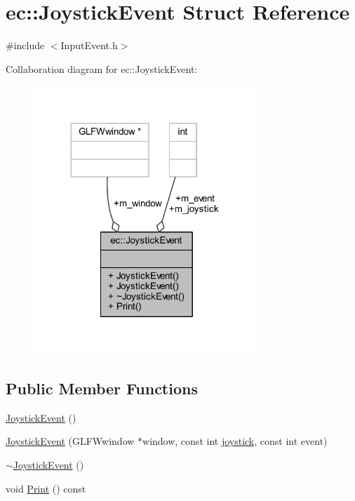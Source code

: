 \hypertarget{structec_1_1_joystick_event}{}\section{ec\+:\+:Joystick\+Event Struct Reference}
\label{structec_1_1_joystick_event}


{\ttfamily \#include $<$Input\+Event.\+h$>$}



Collaboration diagram for ec\+:\+:Joystick\+Event\+:
\nopagebreak
\begin{figure}[H]
\begin{center}
\leavevmode
\includegraphics[width=239pt]{structec_1_1_joystick_event__coll__graph}
\end{center}
\end{figure}
\subsection*{Public Member Functions}
\begin{DoxyCompactItemize}
\item 
\mbox{\hyperlink{structec_1_1_joystick_event_a04113c84c127415b3937c214b3e6eb92}{Joystick\+Event}} ()
\item 
\mbox{\hyperlink{structec_1_1_joystick_event_ac922516c15cb953f16fe666a796ab26e}{Joystick\+Event}} (G\+L\+F\+Wwindow $\ast$window, const int \mbox{\hyperlink{namespaceec_a5de6bdb8c4b2ed6e590e721ec998f964a2ed69833bf8cb33c80eaf0daa892400e}{joystick}}, const int event)
\item 
\mbox{\hyperlink{structec_1_1_joystick_event_a182ea7dcfcd2e363909eb8ea63a41df8}{$\sim$\+Joystick\+Event}} ()
\item 
void \mbox{\hyperlink{structec_1_1_joystick_event_a17fb7233002643d67d0c24b79c91b045}{Print}} () const
\end{DoxyCompactItemize}
